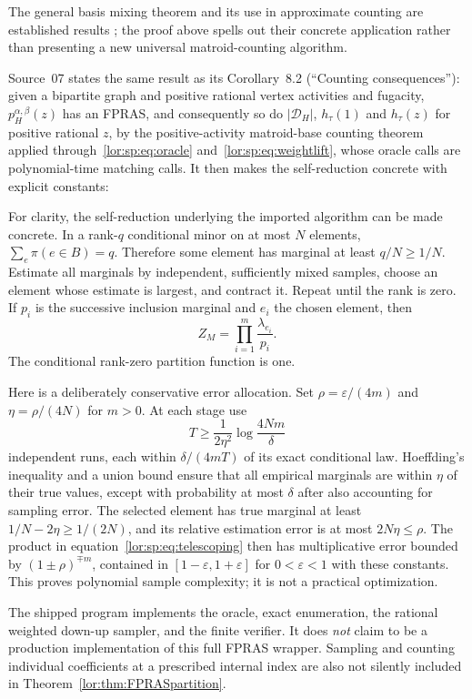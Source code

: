 \documentclass[11pt]{article}
\numberwithin{equation}{section}
\theoremstyle{definition}
\newcommand{\cD}{\mathcal D}
\begin{document}
The general basis mixing theorem and its use in approximate counting are
established results \cite{ALOV}; the proof above spells out their concrete
application rather than presenting a new universal matroid-counting
algorithm.

Source~07 states the same result as its Corollary~8.2 (``Counting
consequences''): given a bipartite graph and positive rational vertex
activities and fugacity, $p_H^{\alpha,\beta}(z)$ has an FPRAS, and consequently
so do $|\cD_H|$, $h_\tau(1)$ and $h_\tau(z)$ for positive rational $z$, by the
positive-activity matroid-base counting theorem~\cite{ALOV} applied
through~\eqref{lor:sp:eq:oracle} and~\eqref{lor:sp:eq:weightlift}, whose oracle
calls are polynomial-time matching calls. It then makes the self-reduction
concrete with explicit constants:

For clarity, the self-reduction underlying the imported algorithm can be
made concrete. In a rank-$q$ conditional minor on at most $N$ elements,
\(\sum_e\pi(e\in B)=q\). Therefore some element has marginal at least
$q/N\ge1/N$. Estimate all marginals by independent, sufficiently mixed samples,
choose an element whose estimate is largest, and contract it. Repeat until the
rank is zero. If $p_i$ is the successive inclusion marginal and $e_i$ the chosen
element, then
\begin{equation}
 Z_M=\prod_{i=1}^{m}\frac{\lambda_{e_i}}{p_i}.
 \label{lor:sp:eq:telescoping}
\end{equation}
The conditional rank-zero partition function is one.

Here is a deliberately conservative error allocation. Set
$\rho=\varepsilon/(4m)$ and $\eta=\rho/(4N)$ for $m>0$. At each stage use
\[
 T\ge\frac{1}{2\eta^2}\log\frac{4Nm}{\delta}
\]
independent runs, each within $\delta/(4mT)$ of its exact conditional law.
Hoeffding's inequality and a union bound ensure that all empirical marginals
are within $\eta$ of their true values, except with probability at most
$\delta$ after also accounting for sampling error. The selected element has
true marginal at least $1/N-2\eta\ge1/(2N)$, and its relative estimation error
is at most $2N\eta\le\rho$. The product in equation~\eqref{lor:sp:eq:telescoping} then has
multiplicative error bounded by $(1\pm\rho)^{\mp m}$, contained in
$[1-\varepsilon,1+\varepsilon]$ for $0<\varepsilon<1$ with these constants.
This proves polynomial sample complexity; it is not a practical optimization.

The shipped program implements the oracle, exact enumeration, the rational
weighted down-up sampler, and the finite verifier. It does \emph{not} claim to
be a production implementation of this full FPRAS wrapper. Sampling and counting
individual coefficients at a prescribed internal index are also not silently
included in Theorem~\ref{lor:thm:FPRASpartition}.
\end{document}
